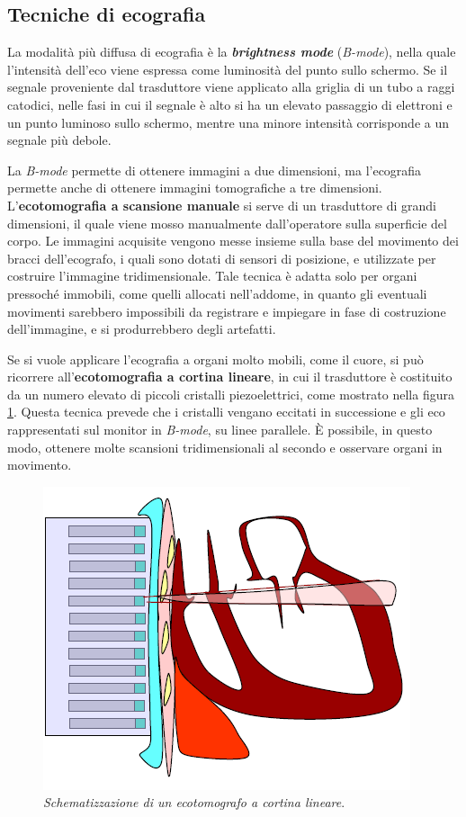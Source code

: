 \documentclass{report}
\newcommand{\figref}[1]{figura \ref{#1}}
\numberwithin{equation}{section}
\numberwithin{figure}{section}
\begin{document}
\subsection{Tecniche di ecografia}
La modalità più diffusa di ecografia è la \textbf{\textit{brightness mode}} (\textit{B-mode}), nella quale l'intensità dell'eco viene espressa come luminosità del punto sullo schermo. Se il segnale proveniente dal trasduttore viene applicato alla griglia di un tubo a raggi catodici, nelle fasi in cui il segnale è alto si ha un elevato passaggio di elettroni e un punto luminoso sullo schermo, mentre una minore intensità corrisponde a un segnale più debole.

La \textit{B-mode} permette di ottenere immagini a due dimensioni, ma l'ecografia permette anche di ottenere immagini tomografiche a tre dimensioni. L'\textbf{ecotomografia a scansione manuale} si serve di un trasduttore di grandi dimensioni, il quale viene mosso manualmente dall'operatore sulla superficie del corpo. Le immagini acquisite vengono messe insieme sulla base del movimento dei bracci dell'ecografo, i quali sono dotati di sensori di posizione, e utilizzate per costruire l'immagine tridimensionale. Tale tecnica è adatta solo per organi pressoché immobili, come quelli allocati nell'addome, in quanto gli eventuali movimenti sarebbero impossibili da registrare e impiegare in fase di costruzione dell'immagine, e si produrrebbero degli artefatti.

Se si vuole applicare l'ecografia a organi molto mobili, come il cuore, si può ricorrere all'\textbf{ecotomografia a cortina lineare}, in cui il trasduttore è costituito da un numero elevato di piccoli cristalli piezoelettrici, come mostrato nella \figref{fig:cortina}. Questa tecnica prevede che i cristalli vengano eccitati in successione e gli eco rappresentati sul monitor in \textit{B-mode}, su linee parallele. È possibile, in questo modo, ottenere molte scansioni tridimensionali al secondo e osservare organi in movimento.

\begin{figure}[htp]
\centering
\includegraphics[scale=0.92]{immagini/cortina.png}
\caption{\label{fig:cortina} \textit{Schematizzazione di un ecotomografo a cortina lineare}.}
\end{figure}
\end{document}
